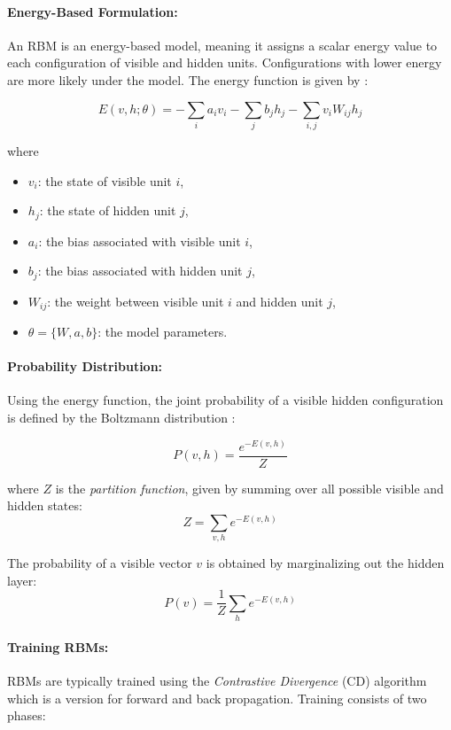 \paragraph{Energy-Based Formulation: } 
An RBM is an energy-based model, meaning it assigns a scalar energy value to each configuration of visible and hidden units. Configurations with lower energy are more likely under the model. The energy function is given by \cite{kong2019improved, zhang2016short}:

\[
E(v,h;\theta) = -\sum_i a_i v_i - \sum_j b_j h_j - \sum_{i,j} v_i W_{ij} h_j
\tag{18}
\label{eqn:12}
\]

where
\begin{itemize}
	\item $v_i$: the state of visible unit $i$,
	\item $h_j$: the state of hidden unit $j$,
	\item $a_i$: the bias associated with visible unit $i$,
	\item $b_j$: the bias associated with hidden unit $j$,
	\item $W_{ij}$: the weight between visible unit $i$ and hidden unit $j$,
	\item $\theta = \{W, a, b\}$: the model parameters.
\end{itemize}

\paragraph{Probability Distribution: } 
Using the energy function, the joint probability of a visible hidden configuration is defined by the Boltzmann distribution \cite{DBN_GeeksforGeeks}:

\[
P(v,h) = \frac{e^{-E(v,h)}}{Z}
\tag{19}
\label{eqn:13}
\]

where $Z$ is the \textit{partition function}, given by summing over all possible visible and hidden states:
\[
Z = \sum_{v,h} e^{-E(v,h)}
\tag{20}
\]

The probability of a visible vector $v$ is obtained by marginalizing out the hidden layer:
\[
P(v) = \frac{1}{Z} \sum_{h} e^{-E(v,h)}
\tag{21}
\]

\paragraph{Training RBMs:} 
RBMs are typically trained using the \textit{Contrastive Divergence} (CD) algorithm which is a version for forward and back propagation. Training consists of two phases:

